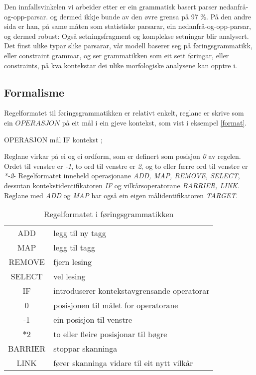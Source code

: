 \documentclass[a4paper,nynorsk]{article}
\begin{document}

Den innfallsvinkelen vi arbeider etter er ein grammatisk basert parser nedanfrå-og-opp-parsar. og dermed ikkje bunde av den øvre grensa på 97 \%. På den andre sida er han, på same måten som statistiske parsarar, ein nedanfrå-og-opp-parsar, og dermed robust: Også setningsfragment og komplekse setningar blir analysert. Det finst ulike typar slike parsarar, vår modell baserer seg på føringsgrammatikk, eller constraint grammar, og ser grammatikken som eit sett føringar, eller constraints, på kva kontekstar dei ulike morfologiske analysene kan opptre i.%

\subsection{Formalisme}

Regelformatet til føringsgrammatikken er relativt enkelt, reglane er skrive som ein $OPERASJON$ på eit mål i ein gjeve kontekst, som vist i eksempel \ref{format}. %

\begin{example}\label{format}
OPERASJON mål IF kontekst ;
\end{example}

Reglane virkar på ei og ei ordform, som er definert som posisjon \emph{0} av regelen. Ordet til venstre er \emph{-1}, to ord til venstre er \emph{2}, og to eller færre ord til venstre er \emph{*-2}- Regelformatet inneheld operasjonane \emph{ADD, MAP, REMOVE, SELECT}, dessutan kontekstidentifikatoren \emph{IF} og vilkårsoperatorane \emph{BARRIER, LINK}. Reglane med \emph{ADD} og \emph{MAP} har også ein eigen målidentifikatoren \emph{TARGET}.%

\begin{table}[htdp]
\caption{Regelformatet i føringsgrammatikken}
\begin{center}
\begin{tabular}{|c|l|}
\hline
 ADD & legg til ny tagg \\
 MAP & legg til tagg \\
 REMOVE & fjern lesing \\
 SELECT & vel lesing \\
\hline 
 IF & introduserer kontekstavgrensande operatorar \\
\hline 
 0 & posisjonen til målet for operatorane \\
 -1 & ein posisjon til venstre \\
 $\ast2$ & to eller fleire posisjonar til høgre \\
\hline 
 BARRIER & stoppar skanninga \\
 LINK & fører skanninga vidare til eit nytt vilkår \\
\hline 
\end{tabular}
\end{center}
\label{default}
\end{table}%
\end{document}
